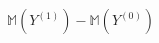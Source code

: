 \documentclass[preview]{standalone}
\begin{document}
\begin{align*}
\mathbb{M}(Y^{(1)}) - \mathbb{M}(Y^{(0)})
\end{align*}
\end{document}
